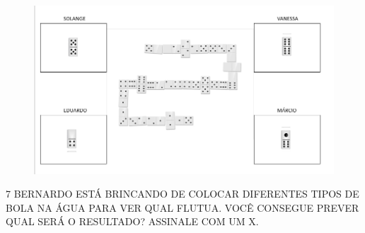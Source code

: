 \begin{figure}[htpb!]
\includegraphics[width=\textwidth]{media/image87.png}
\end{figure}


\num{7} BERNARDO ESTÁ BRINCANDO DE COLOCAR DIFERENTES TIPOS DE BOLA NA ÁGUA
PARA VER QUAL FLUTUA. VOCÊ CONSEGUE PREVER QUAL SERÁ O RESULTADO? ASSINALE
COM UM X.


